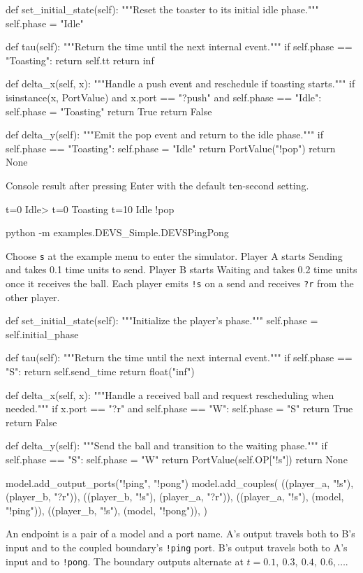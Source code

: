 \documentclass[11pt,a4paper]{article}
\newcommand{\api}[1]{\texttt{#1}}
\newcommand{\chaptermark}[1]{\par\noindent{\LARGE\color{ink}\bfseries #1}\par\smallskip}
\newcommand{\topic}[1]{\par\medskip{\large\color{accent}\bfseries #1}\par}
\begin{document}
\begin{Code}
def set_initial_state(self):
        """Reset the toaster to its initial idle phase."""
        self.phase = "Idle"

def tau(self):
        """Return the time until the next internal event."""
        if self.phase == "Toasting":
            return self.tt
        return inf

def delta_x(self, x):
        """Handle a push event and reschedule if toasting starts."""
        if isinstance(x, PortValue) and x.port == "?push" and self.phase == "Idle":
            self.phase = "Toasting"
            return True
        return False

def delta_y(self):
        """Emit the pop event and return to the idle phase."""
        if self.phase == "Toasting":
            self.phase = "Idle"
            return PortValue("!pop")
        return None
\end{Code}
Console result after pressing Enter with the default ten-second setting.
\begin{Code}
t=0 Idle> t=0 Toasting
t=10 Idle !pop
\end{Code}

\newpage
\chaptermark{2.1 \enspace DEVS, continued}
\topic{2.1.3 \enspace DEVSPingPong}
\begin{Code}
python -m examples.DEVS_Simple.DEVSPingPong
\end{Code}
Choose \api{s} at the example menu to enter the simulator.
Player A starts Sending and takes 0.1 time units to send.
Player B starts Waiting and takes 0.2 time units once it receives
the ball. Each player emits \api{!s} on a send and receives
\api{?r} from the other player.

\begin{Code}
def set_initial_state(self):
        """Initialize the player's phase."""
        self.phase = self.initial_phase

def tau(self):
        """Return the time until the next internal event."""
        if self.phase == "S":
            return self.send_time
        return float("inf")

def delta_x(self, x):
        """Handle a received ball and request rescheduling when needed."""
        if x.port == "?r" and self.phase == "W":
            self.phase = "S"
            return True
        return False

def delta_y(self):
        """Send the ball and transition to the waiting phase."""
        if self.phase == "S":
            self.phase = "W"
            return PortValue(self.OP["!s"])
        return None
\end{Code}
\begin{Code}
model.add_output_ports("!ping", "!pong")
model.add_couples(
    ((player_a, "!s"), (player_b, "?r")),
    ((player_b, "!s"), (player_a, "?r")),
    ((player_a, "!s"), (model, "!ping")),
    ((player_b, "!s"), (model, "!pong")),
)
\end{Code}
An endpoint is a pair of a model and a port name. A's output travels
both to B's input and to the coupled boundary's \api{!ping} port.
B's output travels both to A's input and to \api{!pong}. The boundary
outputs alternate at $t=0.1,\ 0.3,\ 0.4,\ 0.6,\ldots$.
\end{document}
